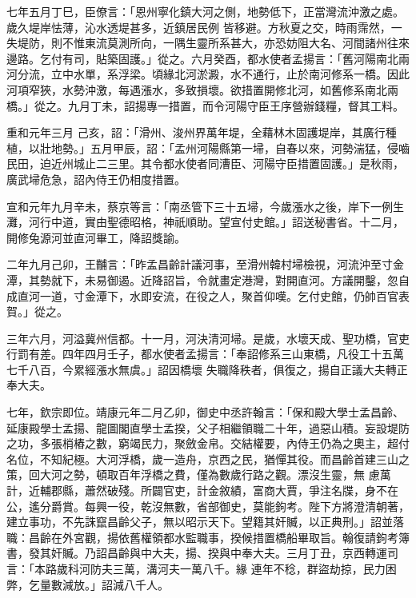 \begin{pinyinscope}
 七年五月丁巳，臣僚言：「恩州寧化鎮大河之側，地勢低下，正當灣流沖激之處。歲久堤岸怯薄，沁水透堤甚多，近鎮居民例
 皆移避。方秋夏之交，時雨霈然，一失堤防，則不惟東流莫測所向，一隅生靈所系甚大，亦恐妨阻大名、河間諸州往來邊路。乞付有司，貼築固護。」從之。六月癸酉，都水使者孟揚言：「舊河陽南北兩河分流，立中水單，系浮梁。頃緣北河淤澱，水不通行，止於南河修系一橋。因此河項窄狹，水勢沖激，每遇漲水，多致損壞。欲措置開修北河，如舊修系南北兩橋。」從之。九月丁未，詔揚專一措置，而令河陽守臣王序營辦錢糧，督其工料。



 重和元年三月
 己亥，詔：「滑州、浚州界萬年堤，全藉林木固護堤岸，其廣行種植，以壯地勢。」五月甲辰，詔：「孟州河陽縣第一埽，自春以來，河勢湍猛，侵嚙民田，迫近州城止二三里。其令都水使者同漕臣、河陽守臣措置固護。」是秋雨，廣武埽危急，詔內侍王仍相度措置。



 宣和元年九月辛未，蔡京等言：「南丞管下三十五埽，今歲漲水之後，岸下一例生灘，河行中道，實由聖德昭格，神祇順助。望宣付史館。」詔送秘書省。十二月，開修兔源河並直河畢工，降詔獎諭。



 二年九月己卯，王黼言：「昨孟昌齡計議河事，至滑州韓村埽檢視，河流沖至寸金潭，其勢就下，未易御遏。近降詔旨，令就畫定港灣，對開直河。方議開鑿，忽自成直河一道，寸金潭下，水即安流，在役之人，聚首仰嘆。乞付史館，仍帥百官表賀。」從之。



 三年六月，河溢冀州信都。十一月，河決清河埽。是歲，水壞天成、聖功橋，官吏行罰有差。四年四月壬子，都水使者孟揚言：「奉詔修系三山東橋，凡役工十五萬七千八百，今累經漲水無虞。」詔因橋壞
 失職降秩者，俱復之，揚自正議大夫轉正奉大夫。



 七年，欽宗即位。靖康元年二月乙卯，御史中丞許翰言：「保和殿大學士孟昌齡、延康殿學士孟揚、龍圖閣直學士孟揆，父子相繼領職二十年，過惡山積。妄設堤防之功，多張梢樁之數，窮竭民力，聚斂金帛。交結權要，內侍王仍為之奧主，超付名位，不知紀極。大河浮橋，歲一造舟，京西之民，猶憚其役。而昌齡首建三山之策，回大河之勢，頓取百年浮橋之費，僅為數歲行路之觀。漂沒生靈，無
 慮萬計，近輔郡縣，蕭然破殘。所闢官吏，計金敘績，富商大賈，爭注名牒，身不在公，遙分爵賞。每興一役，乾沒無數，省部御史，莫能鉤考。陛下方將澄清朝著，建立事功，不先誅竄昌齡父子，無以昭示天下。望籍其奸贓，以正典刑。」詔並落職：昌齡在外宮觀，揚依舊權領都水監職事，揆候措置橋船畢取旨。翰復請鉤考簿書，發其奸贓。乃詔昌齡與中大夫，揚、揆與中奉大夫。三月丁丑，京西轉運司言：「本路歲科河防夫三萬，溝河夫一萬八千。緣
 連年不稔，群盜劫掠，民力困弊，乞量數減放。」詔減八千人。




\end{pinyinscope}
